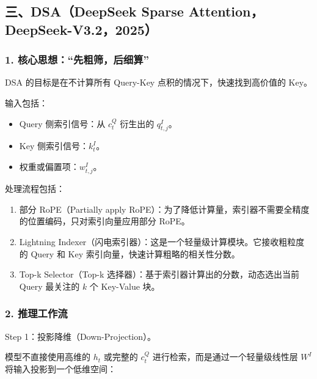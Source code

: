 \hypertarget{ux4e09dsadeepseek-sparse-attentiondeepseek-v3.22025}{%
\subsection{三、DSA（DeepSeek Sparse Attention，DeepSeek-V3.2，2025）}\label{ux4e09dsadeepseek-sparse-attentiondeepseek-v3.22025}}

\hypertarget{ux6838ux5fc3ux601dux60f3ux5148ux7c97ux7b5bux540eux7ec6ux7b97}{%
\subsubsection{1. 核心思想：``先粗筛，后细算''}\label{ux6838ux5fc3ux601dux60f3ux5148ux7c97ux7b5bux540eux7ec6ux7b97}}

DSA 的目标是在不计算所有 Query-Key 点积的情况下，快速找到高价值的 Key。

输入包括：

\begin{itemize}
\tightlist
\item
  Query 侧索引信号：从 \(c_t^Q\) 衍生出的 \(q^I_{t,j}\)。
\item
  Key 侧索引信号：\(k_t^I\)。
\item
  权重或偏置项：\(w^I_{t,j}\)。
\end{itemize}

处理流程包括：

\begin{enumerate}
\def\labelenumi{\arabic{enumi}.}
\tightlist
\item
  部分 RoPE（Partially apply RoPE）：为了降低计算量，索引器不需要全精度的位置编码，只对索引向量应用部分 RoPE。
\item
  Lightning Indexer（闪电索引器）：这是一个轻量级计算模块。它接收粗粒度的 Query 和 Key 索引向量，快速计算粗略的相关性分数。
\item
  Top-k Selector（Top-k 选择器）：基于索引器计算出的分数，动态选出当前 Query 最关注的 \(k\) 个 Key-Value 块。
\end{enumerate}

\hypertarget{ux63a8ux7406ux5de5ux4f5cux6d41}{%
\subsubsection{2. 推理工作流}\label{ux63a8ux7406ux5de5ux4f5cux6d41}}

Step 1：投影降维（Down-Projection）。

模型不直接使用高维的 \(h_t\) 或完整的 \(c_t^Q\) 进行检索，而是通过一个轻量级线性层 \(W^I\) 将输入投影到一个低维空间：

